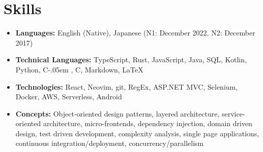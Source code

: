 \documentclass[letterpaper,11pt]{article}
\newcommand{\resumeItem}[2]{
    \vspace{-2pt}
    \item\small{
        \textbf{#1}{ #2 \vspace{-2pt}}
    }
}
\newcommand{\resumeSubItem}[2]{\resumeItem{#1}{#2}}
\def\Cplusplus{C\raisebox{0.5ex}{\tiny\textbf{++}}}
\newcommand{\Csharp}{%
  {\settoheight{\dimen0}{C}C\kern-.05em \resizebox{!}{\dimen0}{\raisebox{\depth}{\#}}}}
\begin{document}
\section{\textbf{Skills}}
\begin{itemize}
    \resumeSubItem{\textbf{Languages:}}
        {
            English (Native),
            Japanese (N1: December 2022, N2: December 2017)
        }
    \resumeSubItem{\textbf{Technical Languages:}}
        {
            TypeScript,
            Rust,
            JavaScript,
            Java,
            SQL,
            Kotlin,
            Python,
            \Csharp,
            \Cplusplus,
            Markdown,
            \LaTeX
        }
    \resumeSubItem{\textbf{Technologies:}}
        {
            React,
            Neovim,
            git,
            RegEx,
            ASP.NET MVC,
            Selenium,
            Docker,
            AWS,
            Serverless,
            Android
        }
    \resumeSubItem{\textbf{Concepts:}}
        {
            Object-oriented design patterns,
            layered architecture,
            service-oriented architecture,
            micro-frontends,
            dependency injection,
            domain driven design,
            test driven development,
            complexity analysis,
            single page applications,
            continuous integration/deployment,
            concurrency/parallelism
        }
 \end{itemize}

\end{document}
